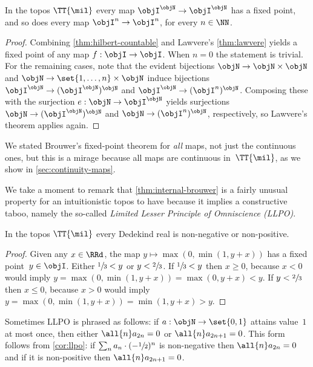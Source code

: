 \begin{theorem}
  \label{thm:internal-brouwer}%
  In the topos $\TT{\mil}$ every map $\objI^\objN \to \objI^\objN$ has a fixed point,
  and so does every map $\objI^n \to \objI^n$, for every $n \in \NN$.
\end{theorem}

\begin{proof}
  Combining \cref{thm:hilbert-countable} and Lawvere's \cref{thm:lawvere} yields a fixed point of any map $f : \objI \to \objI$. When $n = 0$ the statement is trivial. For the remaining cases, note that the evident bijections $\objN \to \objN \times \objN$ and $\objN \to \set{1, \ldots, n} \times \objN$ induce bijections $\objI^\objN \to (\objI^\objN)^\objN$ and $\objI^\objN \to (\objI^n)^\objN$.
  Composing these with the surjection $e : \objN \to \objI^\objN$ yields surjections $\objN \to (\objI^\objN)^\objN$ and $\objN \to (\objI^n)^\objN$, respectively, so Lawvere's theorem applies again.
\end{proof}

We stated Brouwer's fixed-point theorem for \emph{all} maps, not just the continuous ones, but this is a mirage because all maps are continuous in~$\TT{\mil}$, as we show in \cref{sec:continuity-maps}.

We take a moment to remark that \cref{thm:internal-brouwer} is a fairly unusual property for an intuitionistic topos to have because it implies a constructive taboo, namely the so-called \emph{Limited Lesser Principle of Omniscience (LLPO)}.

\begin{corollary}[LLPO]
  \label{cor:llpo}%
  In the topos $\TT{\mil}$ every Dedekind real is non-negative or non-positive.
\end{corollary}

\begin{proof}
  Given any $x \in \RRd$, the map $y \mapsto \max(0, \min(1, y + x))$ has a fixed point~$y \in \objI$.
  Either $\sfrac{1}{3} < y$ or $y < \sfrac{2}{3}$.
  If $\sfrac{1}{3} < y$ then $x \geq 0$, because $x < 0$ would imply $y = \max(0, \min(1, y + x)) = \max(0, y + x) < y$.
  If $y < \sfrac{2}{3}$ then $x \leq 0$, because $x > 0$ would imply $y = \max(0, \min(1, y + x)) = \min(1, y + x) > y$.
\end{proof}

Sometimes LLPO is phrased as follows: if $a : \objN \to \set{0,1}$ attains value~$1$ at most once, then either $\all{n} a_{2 n} = 0$ or $\all{n} a_{2 n + 1} = 0$. This form follows from \cref{cor:llpo}: if $\sum_{n} a_n \cdot (- \sfrac{1}{2})^n$ is non-negative then $\all{n} a_{2 n} = 0$ and if it is non-positive then $\all{n} a_{2 n + 1} = 0$.

